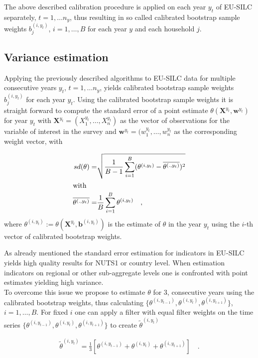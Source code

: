 \documentclass{scrartcl}\usepackage[]{graphicx}\usepackage[]{color}
\begin{document}
The above described calibration procedure is applied on each year $y_t$ of EU-SILC separately, $t=1,\ldots n_y$, thus resulting in so called calibrated bootstrap sample weights $b_{j}^{(i,{y_t})}$, $i=1,\ldots,B$ for each year $y$ and each household $j$.

\subsection{Variance estimation}
Applying the previously described algorithms to EU-SILC data for multiple consecutive years $y_t$, $t=1,\ldots n_y$, yields calibrated bootstrap sample weights $b_{j}^{(i,{y_t})}$ for each year $y_t$. Using the calibrated bootstrap sample weights it is straight forward to compute the standard error of a point estimate $\theta(\textbf{X}^{y_t},\textbf{w}^{y_t})$ for year $y_t$ with $\textbf{X}^{y_t}=(X_1^{y_t},\ldots,X_n^{y_t})$ as the vector of observations for the variable of interest in the survey and $\textbf{w}^{y_t}=(w_1^{y_t},\ldots,w_n^{y_t}$ as the corresponding weight vector, with

\begin{align*}
  sd(\theta) =& \sqrt{\frac{1}{B-1}\sum\limits_{i=1}^B (\theta^{(i,y_t)}-\overline{\theta^{(.,y_t)}})^2} \\
\intertext{with}
  \overline{\theta^{(.,y_t)}} =& \frac{1}{B}\sum\limits_{i=1}^B\theta^{(i,y_t)} \quad,
\end{align*}
where $\theta^{(i,y_t)}:=\theta(\textbf{X}^{y_t},\textbf{b}^{(i,{y_t})})$ is the estimate of $\theta$ in the year $y_t$ using the $i$-th vector of calibrated bootstrap weights.

As already mentioned the standard error estimation for indicators in EU-SILC yields high quality results for NUTS1 or country level. When estimation indicators on regional or other sub-aggregate levels one is confronted with point estimates yielding high variance.\\

To overcome this issue we propose to estimate $\theta$ for 3, consecutive years using the calibrated bootstrap weights, thus calculating $\{\theta^{(i,y_{t-1})},\theta^{(i,y_t)},\theta^{(i,y_{t+1})}\}$, $i=1,\ldots,B$.
For fixed $i$ one can apply a filter with equal filter weights on the time series $\{\theta^{(i,y_{t-1})},\theta^{(i,y_t)},\theta^{(i,y_{t+1})}\}$ to create $\tilde{\theta}^{(i,y_t)}$

\begin{align*}
  \tilde{\theta}^{(i,y_t)} = \frac{1}{3}\left[\theta^{(i,y_{t-1})}+\theta^{(i,y_t)}+\theta^{(i,y_{t+1})}\right] \quad .
\end{align*}
\end{document}
